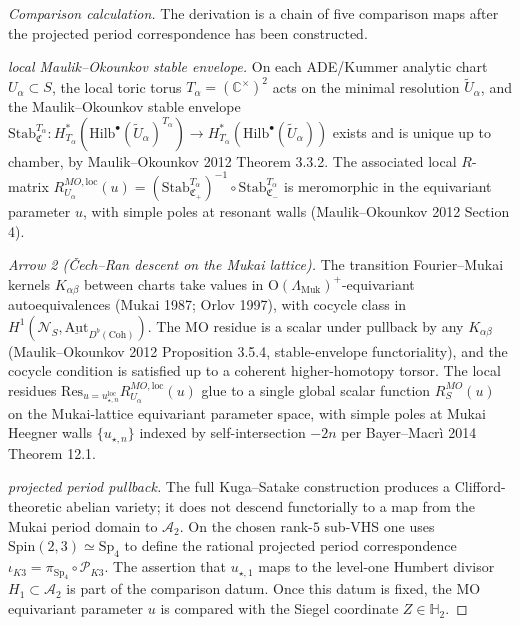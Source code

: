 \begin{proof}[Comparison calculation]
The derivation is a chain of five comparison maps after the projected period correspondence has been constructed.

\emph{local Maulik--Okounkov stable envelope.} On each
ADE/Kummer analytic chart $U_{\alpha} \subset S$, the local toric
torus $T_{\alpha} = (\mathbb{C}^{\times})^{2}$ acts on the minimal
resolution $\widetilde U_{\alpha}$, and the Maulik--Okounkov stable
envelope
$\mathrm{Stab}^{T_{\alpha}}_{\mathfrak{C}}\colon H^{*}_{T_{\alpha}}
(\mathrm{Hilb}^{\bullet}(\widetilde U_{\alpha})^{T_{\alpha}})
\to H^{*}_{T_{\alpha}}(\mathrm{Hilb}^{\bullet}(\widetilde U_{\alpha}))$
exists and is unique up to chamber, by Maulik--Okounkov 2012
Theorem 3.3.2. The associated local $R$-matrix
$R^{MO, \mathrm{loc}}_{U_{\alpha}}(u)
= (\mathrm{Stab}^{T_{\alpha}}_{\mathfrak{C}_{+}})^{-1}
\circ \mathrm{Stab}^{T_{\alpha}}_{\mathfrak{C}_{-}}$
is meromorphic in the equivariant parameter $u$, with simple poles at
resonant walls (Maulik--Okounkov 2012 Section 4).

\emph{Arrow 2 (\v{C}ech--Ran descent on the Mukai lattice).} The
transition Fourier--Mukai kernels $K_{\alpha \beta}$ between charts
take values in $\mathrm{O}(\Lambda_{\mathrm{Muk}})^{+}$-equivariant
autoequivalences (Mukai 1987; Orlov 1997), with cocycle class in
$H^{1}(\mathcal{N}_{S}, \underline{\mathrm{Aut}}_{D^{b}(\mathrm{Coh})})$.
The MO residue is a scalar under pullback by any $K_{\alpha \beta}$
(Maulik--Okounkov 2012 Proposition 3.5.4, stable-envelope
functoriality), and the cocycle condition is satisfied up to a
coherent higher-homotopy torsor. The local residues
$\mathrm{Res}_{u = u_{\star, n}^{\mathrm{loc}}}
R^{MO, \mathrm{loc}}_{U_{\alpha}}(u)$ glue to a single global scalar
function $R^{MO}_{S}(u)$ on the Mukai-lattice equivariant parameter
space, with simple poles at Mukai Heegner walls
$\{u_{\star, n}\}$ indexed by self-intersection $-2n$ per
Bayer--Macr\`i 2014 Theorem 12.1.

\emph{projected period pullback.} The full Kuga--Satake construction produces a Clifford-theoretic abelian variety; it does not descend functorially to a map from the Mukai period domain to \(\mathcal A_2\). On the chosen rank-\(5\) sub-VHS one uses \(\mathrm{Spin}(2,3)\simeq\mathrm{Sp}_4\) to define the rational projected period correspondence \(\iota_{K3}=\pi_{\mathrm{Sp}_4}\circ\mathscr P_{K3}\). The assertion that \(u_{\star,1}\) maps to the level-one Humbert divisor \(H_1\subset\mathcal A_2\) is part of the comparison datum. Once this datum is fixed, the MO equivariant parameter \(u\) is compared with the Siegel coordinate \(Z\in\mathbb H_2\).


\end{proof}
